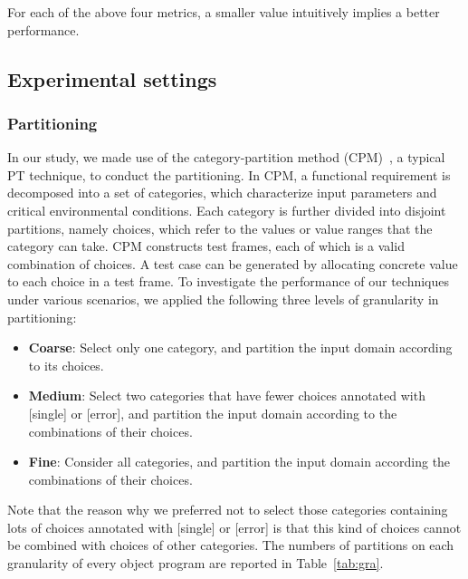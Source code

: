\documentclass[10pt,journal,compsoc]{IEEEtran}
\begin{document}
For each of the above four metrics, a smaller value intuitively implies a better performance.

\subsection{Experimental settings}

\subsubsection{Partitioning}
In our study, we made use of the category-partition method (CPM)~\cite{Ostrand88}, a typical PT technique, to conduct the partitioning. In CPM, a functional requirement is decomposed into a set of categories, which characterize input parameters and critical environmental conditions. Each category is further divided into disjoint partitions, namely choices, which refer to the values or value ranges that the category can take. CPM constructs test frames, each of which is a valid combination of choices. A test case can be generated by allocating concrete value to each choice in a test frame. To investigate the performance of our techniques under various scenarios, we applied the following three levels of granularity in partitioning:

\begin{itemize}
\item \textbf{Coarse}: Select only one category, and partition the input domain according to its choices.
\item \textbf{Medium}: Select two categories that have fewer choices annotated with [single] or [error], and partition the input domain according to the combinations of their choices.
\item \textbf{Fine}: Consider all categories, and partition the input domain according the combinations of their choices.
\end{itemize}

Note that the reason why we preferred not to select those categories containing lots of choices annotated with [single] or [error] is that this kind of choices cannot be combined with choices of other categories. The numbers of partitions on each granularity of every object program are reported in Table~\ref{tab:gra}.

\end{document}

